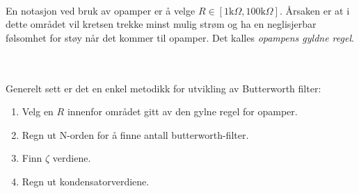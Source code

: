 \documentclass[a4paper,11pt,norsk]{article}
\begin{document}
\\
En notasjon ved bruk av opamper er å velge $R\in[1\textrm{k}\Omega, 100\textrm{k}\Omega]$. Årsaken er at i dette området vil kretsen trekke minst mulig strøm og ha en neglisjerbar følsomhet for støy når det kommer til opamper. Det kalles \textit{opampens gyldne regel}.

\\\\ Generelt sett er det en enkel metodikk for utvikling av Butterworth filter: 
\begin{enumerate}
    \item Velg en $R$ innenfor området gitt av den gylne regel for opamper. 
    \item Regn ut N-orden for å finne antall butterworth-filter.
    \item Finn $\zeta$ verdiene.
    \item Regn ut kondensatorverdiene.
\end{enumerate}


\newpage
\end{document}
